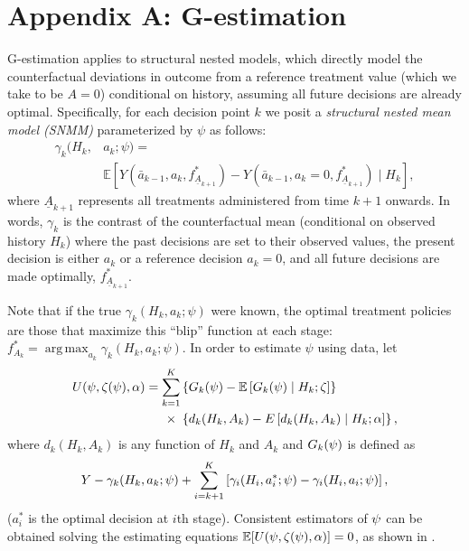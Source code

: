 \documentclass[letterpaper]{article} %
\newcommand{\E}{\mathbb{E}}
\DeclareMathOperator*{\argmax}{arg\,max}
\begin{document}
\section*{Appendix A: G-estimation}
G-estimation applies to structural nested models, which directly model the counterfactual deviations in outcome from a reference treatment value (which we take to be $A=0$) conditional on history, assuming all future decisions are already optimal. Specifically, for each decision point $k$ we posit a \emph{structural nested mean
	model (SNMM)} parameterized by $\psi$ as follows: %
{\small
\begin{align*}
\gamma_k(H_k, &a_k; \psi) =\\
&\E[ Y(\bar{a}_{k-1}, a_k, f^*_{\underline{A}_{k+1}}) - Y(\bar{a}_{k-1}, a_k=0, f^*_{\underline{A}_{k+1}}) \mid H_k ],  
\end{align*}
}%
where $\underline{A}_{k+1}$ represents all treatments administered from time $k+1$ onwards. In words, $\gamma_k$ is the contrast of the counterfactual mean (conditional on observed history $H_k$) where the past decisions are set to their observed values, the present decision is either $a_k$ or a reference decision $a_k = 0$, and all future decisions are made optimally, $f^*_{\underline{A}_{k+1}}$.  

Note that if the true $\gamma_k(H_k,a_k;\psi)$ were known, the optimal treatment policies are those that maximize this ``blip'' function at each stage: $f^*_{A_k} = \argmax_{a_k} \gamma_k(H_k, a_k; \psi)$.
In order to estimate $\psi$ using data, let 
{\small
	\begin{align}
	U({\bf \psi, \zeta(\psi), \alpha}) = \sum_{k=1}^{K} &\left\{ G_k({\bf \psi}) - \E\left[G_k({\bf \psi}) \mid H_k; %
	{\bf \zeta} \right] \right\} 
	\nonumber \\
	\times \ &\left\{ d_k(H_k, A_k) - E\left[d_k(H_k, A_k) \mid H_k; {\bf \alpha}\right] \right\}, 
	\label{eqn:G-estim}
	\end{align}
}%
where $d_k(H_k, A_k)$ is any function of $H_k$ and $A_k$ and $G_k({\bf \psi})$ is defined as 
{\small
	\begin{align*}
	Y  - \gamma_k(H_k, a_k; {\bf \psi}) + \sum_{i = k + 1}^{K} \left[ \gamma_i(H_i, a^*_i; {\bf \psi}) - \gamma_i(H_i, a_i; {\bf \psi}) \right],
	\end{align*}
}%
($a^*_i$ is the optimal decision at $i$th stage).   
Consistent estimators of ${\bf \psi}$ can be obtained solving the estimating equations $\E[U({\bf \psi, \zeta(\psi), \alpha})] = 0$, as shown in \citet{robins04SNMM}. 
\end{document}
